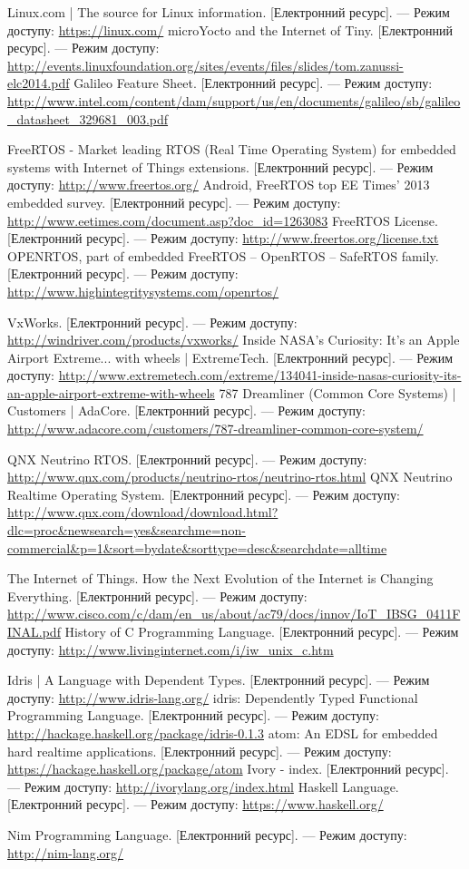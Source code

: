 \documentclass[oneside,14pt,a4paper,final]{myextreport}
\newcommand{\eresource}[2]{#1. [Електронний ресурс]. --- Режим доступу: \url{#2}}
\begin{document}
\begin{thebibliography}{00}
    \eresource{Linux.com | The source for Linux information}{https://linux.com/}
    \eresource{microYocto and the Internet of Tiny}{http://events.linuxfoundation.org/sites/events/files/slides/tom.zanussi-elc2014.pdf}
    \eresource{Galileo Feature Sheet}{http://www.intel.com/content/dam/support/us/en/documents/galileo/sb/galileo\_datasheet\_329681\_003.pdf}

    \eresource{FreeRTOS - Market leading RTOS (Real Time Operating System) for embedded systems with Internet of Things extensions}{http://www.freertos.org/}
    \eresource{Android, FreeRTOS top EE Times' 2013 embedded survey}{http://www.eetimes.com/document.asp?doc\_id=1263083}
    \eresource{FreeRTOS License}{http://www.freertos.org/license.txt}
    \eresource{OPENRTOS, part of embedded FreeRTOS -- OpenRTOS -- SafeRTOS family}{http://www.highintegritysystems.com/openrtos/}

    \eresource{VxWorks}{http://windriver.com/products/vxworks/}
    \eresource{Inside NASA's Curiosity: It's an Apple Airport Extreme... with wheels | ExtremeTech}{http://www.extremetech.com/extreme/134041-inside-nasas-curiosity-its-an-apple-airport-extreme-with-wheels}
    \eresource{787 Dreamliner (Common Core Systems) | Customers | AdaCore}{http://www.adacore.com/customers/787-dreamliner-common-core-system/}

    \eresource{QNX Neutrino RTOS}{http://www.qnx.com/products/neutrino-rtos/neutrino-rtos.html}
    \eresource{QNX Neutrino Realtime Operating System}{http://www.qnx.com/download/download.html?dlc=proc&newsearch=yes&searchme=non-commercial&p=1&sort=bydate&sorttype=desc&searchdate=alltime}

    \eresource{The Internet of Things. How the Next Evolution of the Internet is Changing Everything}{http://www.cisco.com/c/dam/en\_us/about/ac79/docs/innov/IoT\_IBSG\_0411FINAL.pdf}
    \eresource{History of C Programming Language}{http://www.livinginternet.com/i/iw\_unix\_c.htm}

    \eresource{Idris | A Language with Dependent Types}{http://www.idris-lang.org/}
    \eresource{idris: Dependently Typed Functional Programming Language}{http://hackage.haskell.org/package/idris-0.1.3}
    \eresource{atom: An EDSL for embedded hard realtime applications}{https://hackage.haskell.org/package/atom}
    \eresource{Ivory - index}{http://ivorylang.org/index.html}
    \eresource{Haskell Language}{https://www.haskell.org/}

    \eresource{Nim Programming Language}{http://nim-lang.org/}

\end{thebibliography}
\end{document}
